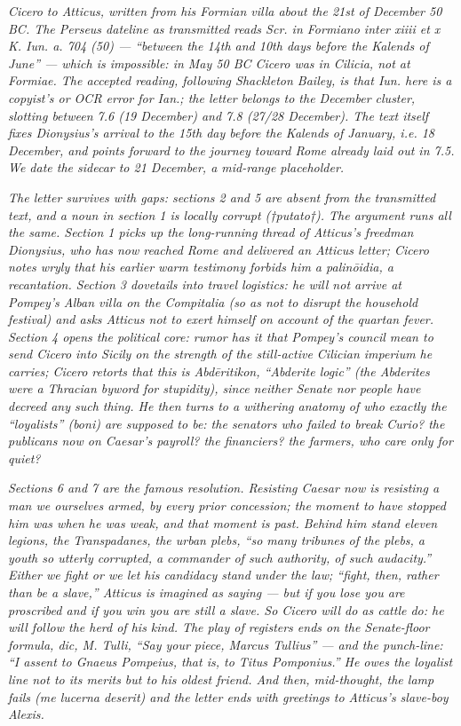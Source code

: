 
\textit{Cicero to Atticus, written from his Formian villa
about the 21st of December 50 BC. The Perseus dateline as
transmitted reads
\textit{Scr. in Formiano inter xiiii et x K. Iun. a. 704
(50)} --- ``between the 14th and 10th days before the Kalends
of June'' --- which is impossible: in May 50 BC Cicero was in
Cilicia, not at Formiae. The accepted reading, following
Shackleton Bailey, is that \textit{Iun.} here is a copyist's
or OCR error for \textit{Ian.}; the letter belongs to the
December cluster, slotting between 7.6 (19 December) and 7.8
(27/28 December). The text itself fixes Dionysius's arrival
to the 15th day before the Kalends of January, i.e. 18
December, and points forward to the journey toward Rome
already laid out in 7.5. We date the sidecar to 21 December,
a mid-range placeholder.}

\textit{The letter survives with gaps: sections 2 and 5 are
absent from the transmitted text, and a noun in section 1 is
locally corrupt (\textit{†putato†}). The argument runs all
the same. Section 1 picks up the long-running thread of
Atticus's freedman Dionysius, who has now reached Rome and
delivered an Atticus letter; Cicero notes wryly that his
earlier warm testimony forbids him a \emph{palinōidia}, a
recantation. Section 3 dovetails into travel logistics: he
will not arrive at Pompey's Alban villa on the
\textit{Compitalia} (so as not to disrupt the household
festival) and asks Atticus not to exert himself on account
of the quartan fever. Section 4 opens the political core:
rumor has it that Pompey's council mean to send Cicero into
Sicily on the strength of the still-active Cilician imperium
he carries; Cicero retorts that this is \emph{Abdēritikon},
``Abderite logic'' (the Abderites were a Thracian byword for
stupidity), since neither Senate nor people have decreed any
such thing. He then turns to a withering anatomy of who
exactly the ``loyalists'' (\emph{boni}) are supposed to be:
the senators who failed to break Curio? the publicans now
on Caesar's payroll? the financiers? the farmers, who care
only for quiet?}

\textit{Sections 6 and 7 are the famous resolution. Resisting
Caesar now is resisting a man we ourselves armed, by every
prior concession; the moment to have stopped him was when
he was weak, and that moment is past. Behind him stand
eleven legions, the Transpadanes, the urban plebs, ``so
many tribunes of the plebs, a youth so utterly corrupted, a
commander of such authority, of such audacity.'' Either we
fight or we let his candidacy stand under the law; ``fight,
then, rather than be a slave,'' Atticus is imagined as
saying --- but if you lose you are proscribed and if you win
you are still a slave. So Cicero will do as cattle do: he
will follow the herd of his kind. The play of registers ends
on the Senate-floor formula, \emph{dic, M. Tulli}, ``Say your
piece, Marcus Tullius'' --- and the punch-line: ``I assent to
Gnaeus Pompeius, that is, to Titus Pomponius.'' He owes the
loyalist line not to its merits but to his oldest friend.
And then, mid-thought, the lamp fails (\emph{me lucerna
deserit}) and the letter ends with greetings to Atticus's
slave-boy Alexis.}
